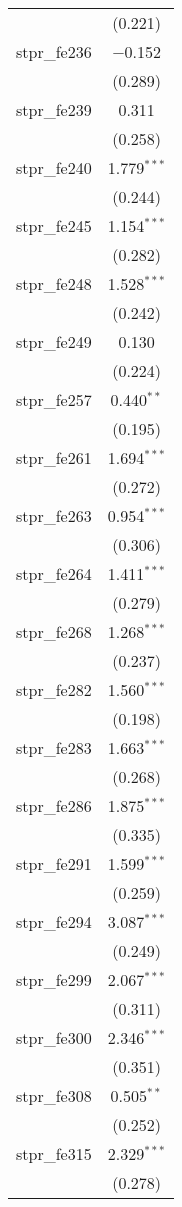 \begin{table}[!htbp]
\begin{tabular}{@{\extracolsep{5pt}}lc}
  & (0.221) \\ 
  stpr\_fe236 & $-$0.152 \\ 
  & (0.289) \\ 
  stpr\_fe239 & 0.311 \\ 
  & (0.258) \\ 
  stpr\_fe240 & 1.779$^{***}$ \\ 
  & (0.244) \\ 
  stpr\_fe245 & 1.154$^{***}$ \\ 
  & (0.282) \\ 
  stpr\_fe248 & 1.528$^{***}$ \\ 
  & (0.242) \\ 
  stpr\_fe249 & 0.130 \\ 
  & (0.224) \\ 
  stpr\_fe257 & 0.440$^{**}$ \\ 
  & (0.195) \\ 
  stpr\_fe261 & 1.694$^{***}$ \\ 
  & (0.272) \\ 
  stpr\_fe263 & 0.954$^{***}$ \\ 
  & (0.306) \\ 
  stpr\_fe264 & 1.411$^{***}$ \\ 
  & (0.279) \\ 
  stpr\_fe268 & 1.268$^{***}$ \\ 
  & (0.237) \\ 
  stpr\_fe282 & 1.560$^{***}$ \\ 
  & (0.198) \\ 
  stpr\_fe283 & 1.663$^{***}$ \\ 
  & (0.268) \\ 
  stpr\_fe286 & 1.875$^{***}$ \\ 
  & (0.335) \\ 
  stpr\_fe291 & 1.599$^{***}$ \\ 
  & (0.259) \\ 
  stpr\_fe294 & 3.087$^{***}$ \\ 
  & (0.249) \\ 
  stpr\_fe299 & 2.067$^{***}$ \\ 
  & (0.311) \\ 
  stpr\_fe300 & 2.346$^{***}$ \\ 
  & (0.351) \\ 
  stpr\_fe308 & 0.505$^{**}$ \\ 
  & (0.252) \\ 
  stpr\_fe315 & 2.329$^{***}$ \\ 
  & (0.278) \\ 

\end{tabular}
\end{table}
